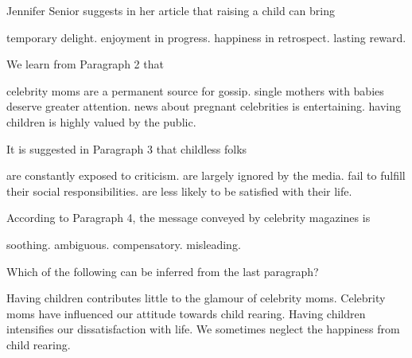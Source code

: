 \item Jennifer Senior suggests in her article that raising a child can bring
\begin{tasks}
	\task temporary delight.
	\task enjoyment in progress.
	\task happiness in retrospect.
	\task lasting reward.
\end{tasks}
\item We learn from Paragraph 2 that
\begin{tasks}
	\task celebrity moms are a permanent source for gossip.
	\task single mothers with babies deserve greater attention.
	\task news about pregnant celebrities is entertaining.
	\task having children is highly valued by the public.
\end{tasks}
\item It is suggested in Paragraph 3 that childless folks
\begin{tasks}
	\task are constantly exposed to criticism.
	\task are largely ignored by the media.
	\task fail to fulfill their social responsibilities.
	\task are less likely to be satisfied with their life.
\end{tasks}
\item According to Paragraph 4, the message conveyed by celebrity magazines is
\begin{tasks}
	\task soothing.
	\task ambiguous.
	\task compensatory.
	\task misleading.
\end{tasks}
\item Which of the following can be inferred from the last paragraph?
\begin{tasks}
	\task Having children contributes little to the glamour of celebrity moms.
	\task Celebrity moms have influenced our attitude towards child rearing.
	\task Having children intensifies our dissatisfaction with life.
	\task We sometimes neglect the happiness from child rearing.
\end{tasks}